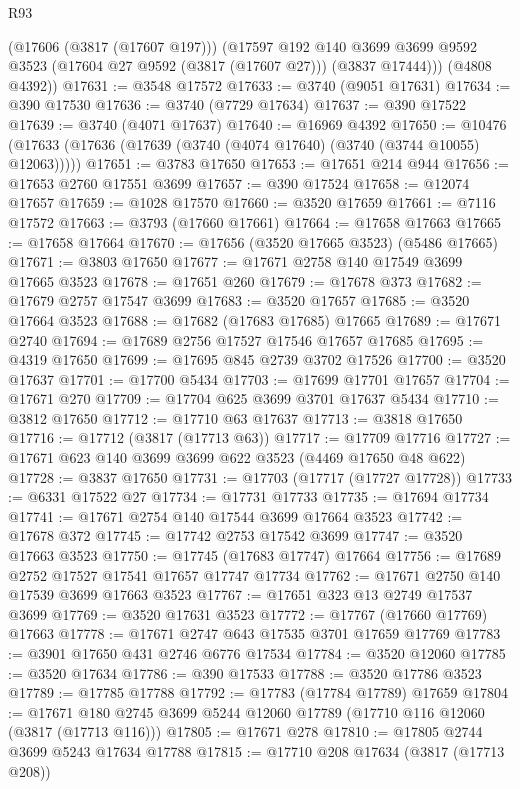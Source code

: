 \begin{lexlean}{R93}
\begin{coremodule}
        (@17606 (@3817 (@17607 @197)))
        (@17597
          @192
          @140
          @3699
          @3699
          @9592
          @3523
          (@17604 @27 @9592 (@3817 (@17607 @27)))
          (@3837 @17444)))
      (@4808 @4392))
@17631 := @3548 @17572
@17633 := @3740 (@9051 @17631)
@17634 := @390 @17530
@17636 := @3740 (@7729 @17634)
@17637 := @390 @17522
@17639 := @3740 (@4071 @17637)
@17640 := @16969 @4392
@17650 := @10476 (@17633 (@17636 (@17639 (@3740 (@4074 @17640) (@3740 (@3744 @10055) @12063)))))
@17651 := @3783 @17650
@17653 := @17651 @214 @944
@17656 := @17653 @2760 @17551 @3699
@17657 := @390 @17524
@17658 := @12074 @17657
@17659 := @1028 @17570
@17660 := @3520 @17659
@17661 := @7116 @17572
@17663 := @3793 (@17660 @17661)
@17664 := @17658 @17663
@17665 := @17658 @17664
@17670 := @17656 (@3520 @17665 @3523) (@5486 @17665)
@17671 := @3803 @17650
@17677 := @17671 @2758 @140 @17549 @3699 @17665 @3523
@17678 := @17651 @260
@17679 := @17678 @373
@17682 := @17679 @2757 @17547 @3699
@17683 := @3520 @17657
@17685 := @3520 @17664 @3523
@17688 := @17682 (@17683 @17685) @17665
@17689 := @17671 @2740
@17694 := @17689 @2756 @17527 @17546 @17657 @17685
@17695 := @4319 @17650
@17699 := @17695 @845 @2739 @3702 @17526
@17700 := @3520 @17637
@17701 := @17700 @5434
@17703 := @17699 @17701 @17657
@17704 := @17671 @270
@17709 := @17704 @625 @3699 @3701 @17637 @5434
@17710 := @3812 @17650
@17712 := @17710 @63 @17637
@17713 := @3818 @17650
@17716 := @17712 (@3817 (@17713 @63))
@17717 := @17709 @17716
@17727 := @17671 @623 @140 @3699 @3699 @622 @3523 (@4469 @17650 @48 @622)
@17728 := @3837 @17650
@17731 := @17703 (@17717 (@17727 @17728))
@17733 := @6331 @17522 @27
@17734 := @17731 @17733
@17735 := @17694 @17734
@17741 := @17671 @2754 @140 @17544 @3699 @17664 @3523
@17742 := @17678 @372
@17745 := @17742 @2753 @17542 @3699
@17747 := @3520 @17663 @3523
@17750 := @17745 (@17683 @17747) @17664
@17756 := @17689 @2752 @17527 @17541 @17657 @17747 @17734
@17762 := @17671 @2750 @140 @17539 @3699 @17663 @3523
@17767 := @17651 @323 @13 @2749 @17537 @3699
@17769 := @3520 @17631 @3523
@17772 := @17767 (@17660 @17769) @17663
@17778 := @17671 @2747 @643 @17535 @3701 @17659 @17769
@17783 := @3901 @17650 @431 @2746 @6776 @17534
@17784 := @3520 @12060
@17785 := @3520 @17634
@17786 := @390 @17533
@17788 := @3520 @17786 @3523
@17789 := @17785 @17788
@17792 := @17783 (@17784 @17789) @17659
@17804 := @17671 @180 @2745 @3699 @5244 @12060 @17789 (@17710 @116 @12060 (@3817 (@17713 @116)))
@17805 := @17671 @278
@17810 := @17805 @2744 @3699 @5243 @17634 @17788
@17815 := @17710 @208 @17634 (@3817 (@17713 @208))

\end{coremodule}
\end{lexlean}
